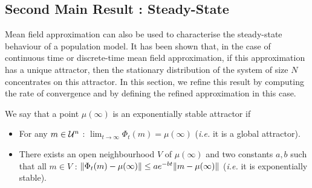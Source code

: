 \documentclass{elsarticle}
\begin{document}
\subsection{Second Main Result : Steady-State}
\label{ssec:steady}

Mean field approximation can also be used to characterise the
steady-state behaviour of a population model. It has been shown that,
in the case of continuous time or discrete-time mean field
approximation, if this approximation has a unique attractor, then the
stationary distribution of the system of size $N$ concentrates on this
attractor. In this section, we refine this result by computing the
rate of convergence and by defining the refined approximation in this
case.

We say that a point $\mu(\infty)$ is an exponentially stable attractor
if
\begin{itemize}
\item For any $m\in{\cal U}^n$ : $\lim_{t\to\infty}\Phi_t(m)=\mu(\infty)$
  (\emph{i.e.} it is a global attractor).
\item There exists an open neighbourhood $V$ of $\mu(\infty)$ and two
  constants $a,b$ such that all $m\in V$ :
  $\norm{\Phi_t(m)-\mu(\infty)}\le a e^{-bt}\norm{m-\mu(\infty)}$
  (\emph{i.e.}  it is exponentially stable).
\end{itemize}
\end{document}
